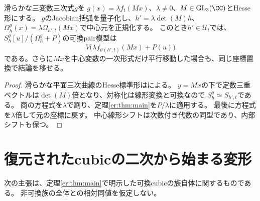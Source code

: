 \begin{corollary}[任意の滑らかな三変数三次式]\label{er:cor:ternary}
滑らかな三変数三次式$g$を
$g(x)=\lambda f_t(Mx)$、$\lambda\ne0$、$M\in\mathrm{GL}_3(\CC)$とHesse形にする。
$g$のJacobian括弧を量子化し、$h'=\lambda\det(M)h$、
$\Omega_h^g(x)=\lambda\Omega_{h',t}(Mx)$で中心元を正規化する。
このとき$h'\in\mathscr U_t$では、
$S_h^g[u]/(\Omega_h^g+P)$の可換pair模型は
\[
 V\bigl(\lambda f_{\vartheta(h',t)}(Mx)+P(u)\bigr)
\]
である。さらに$Mx$を中心変数の一次形式だけ平行移動した場合も、同じ座標置換で結論を移せる。
\end{corollary}
\begin{proof}
滑らかな平面三次曲線のHesse標準形は\cite[Lemma 1]{ArtebaniDolgachev}による。
$y=Mx$の下で定数三重ベクトルは$\det(M)$倍となり、対称化は線形変換と可換なので
$S_h^g\simeq S_{h',t}$である。
商の方程式を$\lambda$で割り、定理\ref{er:thm:main}を$P/\lambda$に適用する。
最後に方程式を$\lambda$倍して元の座標に戻す。
中心線形シフトは次数付き代数の同型であり、内部シフトも保つ。
\end{proof}

\section{復元されたcubicの二次から始まる変形}\label{er:sec:second-order}
次の主張は、定理\ref{er:thm:main}で明示した可換cubicの族自体に関するものである。
非可換族の全体との相対同値を仮定しない。

